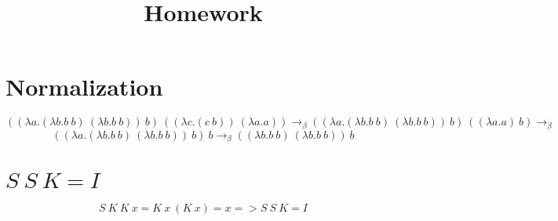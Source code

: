 \documentclass{article}
\title{Homework}
\date{}
\begin{document}
\section{Normalization}

\large$$((\lambda a.(\lambda  b.b\ b)\ (\lambda b.b\ b))\ b)\ ((\lambda c.(c\ b))\ (\lambda a.a)) \rightarrow_\beta
((\lambda a.(\lambda  b.b\ b)\ (\lambda b.b\ b))\ b)\ ((\lambda a.a)\ b) \rightarrow_\beta$$
$$((\lambda a.(\lambda  b.b\ b)\ (\lambda b.b\ b))\ b)\ b \rightarrow_\beta
((\lambda  b.b\ b)\ (\lambda b.b\ b))\ b$$

\section{$S\ S\ K = I$}
$$S\ K\ K\ x = K\ x\ (K\ x) = x => S\ S\ K = I$$
\end{document}
